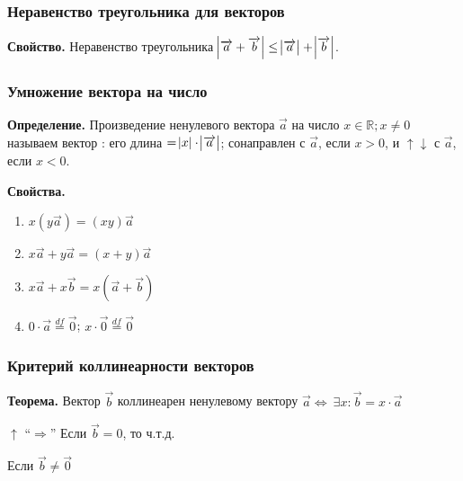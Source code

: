 \documentclass{article}
\begin{document}
    \subsubsection{Неравенство треугольника для векторов}

    \textbf{Свойство.} Неравенство треугольника \(\abs{\overrightarrow{a} + \overrightarrow{b}} \leq \abs{\overrightarrow{a}} + \abs{\overrightarrow{b}}\).

    \subsubsection{Умножение вектора на число}

    \textbf{Определение.} Произведение ненулевого вектора \(\overrightarrow{a}\) на число \(x \in \mathbb{R}; x \neq 0\) называем вектор : его длина \(= \abs{x}\cdot\abs{\overrightarrow{a}}\); сонаправлен с \(\overrightarrow{a}\), если \(x > 0\), и \(\uparrow\downarrow\) с \(\overrightarrow{a}\), если \(x < 0\).

    \textbf{Свойства.}

    \begin{enumerate}
        \item \( x(y\overrightarrow{a}) = (xy)\overrightarrow{a} \)
        \item \( x\overrightarrow{a} + y\overrightarrow{a} = (x + y)\overrightarrow{a} \)
        \item \( x\overrightarrow{a} + x\overrightarrow{b} = x(\overrightarrow{a} + \overrightarrow{b}) \)
        \item \( 0 \cdot \overrightarrow{a} \stackrel{df}{=} \overrightarrow{0} \); \( x \cdot \overrightarrow{0} \stackrel{df}{=} \overrightarrow{0} \)
    \end{enumerate}

    \subsubsection{Критерий коллинеарности векторов}
    
    \textbf{Теорема.} Вектор $\overrightarrow{b}$ коллинеарен ненулевому вектору $\overrightarrow{a} \Leftrightarrow\ \exists x : \overrightarrow{b} = x\cdot\overrightarrow{a} $ 

    $\uparrow$ ``$\Rightarrow$'' Если \(\overrightarrow{b} = 0\), то ч.т.д.
    
    Если $\overrightarrow{b} \neq \overrightarrow{0}$
\end{document}
